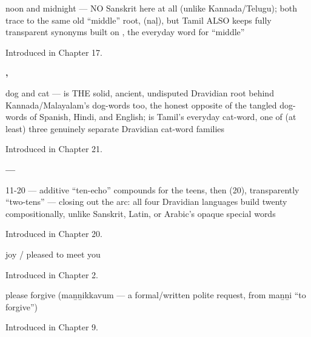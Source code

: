 \noindent\begin{minipage}[t]{\linewidth}
\raggedright
\textbf{ }\par
\small noon and midnight — NO Sanskrit here at all (unlike Kannada/Telugu); both trace to the same old \textquotedblleft{}middle\textquotedblright{} root,  (naḷ), but Tamil ALSO keeps fully transparent synonyms built on , the everyday word for \textquotedblleft{}middle\textquotedblright{}\par
\footnotesize Introduced in Chapter 17.
\end{minipage}\par\medskip

\noindent\begin{minipage}[t]{\linewidth}
\raggedright
\textbf{, }\par
\small dog and cat —  is THE solid, ancient, undisputed Dravidian root behind Kannada/Malayalam's dog-words too, the honest opposite of the tangled dog-words of Spanish, Hindi, and English;  is Tamil's everyday cat-word, one of (at least) three genuinely separate Dravidian cat-word families\par
\footnotesize Introduced in Chapter 21.
\end{minipage}\par\medskip

\noindent\begin{minipage}[t]{\linewidth}
\raggedright
\textbf{ — }\par
\small 11-20 — additive \textquotedblleft{}ten-echo\textquotedblright{} compounds for the teens, then  (20), transparently \textquotedblleft{}two-tens\textquotedblright{} — closing out the arc: all four Dravidian languages build twenty compositionally, unlike Sanskrit, Latin, or Arabic's opaque special words\par
\footnotesize Introduced in Chapter 20.
\end{minipage}\par\medskip

\noindent\begin{minipage}[t]{\linewidth}
\raggedright
\textbf{}\par
\small joy / pleased to meet you\par
\footnotesize Introduced in Chapter 2.
\end{minipage}\par\medskip

\noindent\begin{minipage}[t]{\linewidth}
\raggedright
\textbf{}\par
\small please forgive (maṉṉikkavum — a formal/written polite request, from  maṉṉi \textquotedblleft{}to forgive\textquotedblright{})\par
\footnotesize Introduced in Chapter 9.
\end{minipage}\par\medskip

